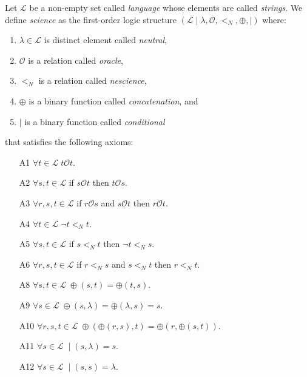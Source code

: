 \begin{definition}

Let $\mathcal{L}$ be a non-empty set called \emph{language} whose elements are called \emph{strings}. We define \emph{science} as the first-order logic structure $(\mathcal{L} \mid \lambda, \mathcal{O}, <_N, \oplus, \mid)$ where:

\vskip 0.25cm

\begin{enumerate}[label=(\roman*)]
\item $\lambda \in \mathcal{L}$ is distinct element called \emph{neutral},
\item $\mathcal{O}$ is a relation called \emph{oracle},
\item $<_N$ is a relation called \emph{nescience},
\item $\oplus$ is a binary function called \emph{concatenation}, and
\item $\mid$ is a binary function called \emph{conditional}
\end{enumerate}

\vskip 0.25cm

that satisfies the following axioms:

\vskip 0.25cm

\begin{itemize}

\item[A1] $\forall t \in \mathcal{L} \; t \mathcal{O} t$.
\item[A2] $\forall s , t \in \mathcal{L}$ if $s \mathcal{O} t$ then $t \mathcal{O} s$.
\item[A3] $\forall r, s , t \in \mathcal{L}$ if $r \mathcal{O} s$ and $s \mathcal{O} t$ then $r \mathcal{O} t$.

\vskip 0.25cm

\item[A4] $\forall t \in \mathcal{L} \; \lnot t <_N t$.
\item[A5] $\forall s , t \in \mathcal{L}$ if $s <_N t$ then $\lnot t <_N s$.
\item[A6] $\forall r , s, t \in \mathcal{L}$ if $r <_N s$ and $s <_N t$ then $r <_N t$.

\vskip 0.25cm

\item[A8] $\forall s, t \in \mathcal{L} \; \oplus(s, t) = \oplus(t, s)$.
\item[A9] $\forall s \in \mathcal{L} \; \oplus(s, \lambda) = \oplus( \lambda, s) = s$.
\item[A10] $\forall r, s, t \in \mathcal{L} \; \oplus(\oplus(r, s), t) = \oplus(r, \oplus(s, t))$.

\vskip 0.25cm

\item[A11] $\forall s \in \mathcal{L} \; \mid (s, \lambda) = s$.
\item[A12] $\forall s \in \mathcal{L} \; \mid (s, s) = \lambda$.

\end{itemize}

\end{definition}

